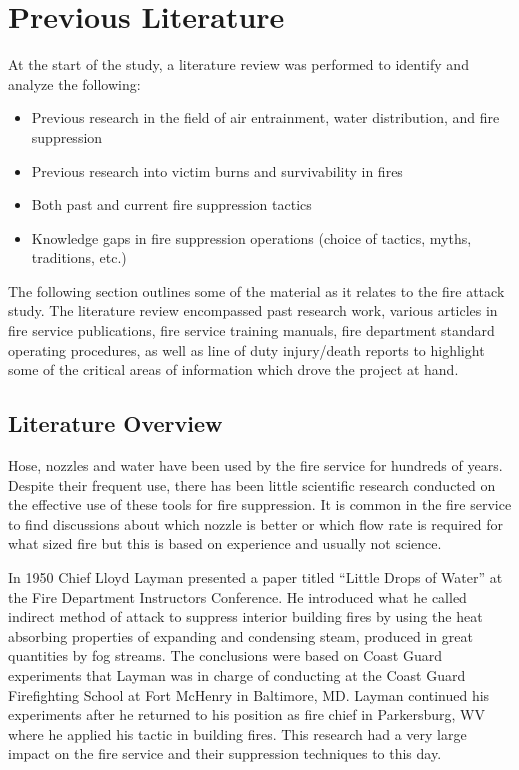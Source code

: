 \documentclass{article}
\begin{document}
\clearpage

\section{Previous Literature}

At the start of the study, a literature review was performed to identify and analyze the following:

\begin{itemize}
	\item Previous research in the field of air entrainment, water distribution, and fire suppression
	\item Previous research into victim burns and survivability in fires
	\item Both past and current fire suppression tactics 
	\item Knowledge gaps in fire suppression operations (choice of tactics, myths, traditions, etc.) 
\end{itemize}

The following section outlines some of the material as it relates to the fire attack study. The literature review encompassed past research work, various articles in fire service publications, fire service training manuals, fire department standard operating procedures, as well as line of duty injury/death reports to highlight some of the critical areas of information which drove the project at hand.

\subsection{Literature Overview}

Hose, nozzles and water have been used by the fire service for hundreds of years. Despite their frequent use, there has been little scientific research conducted on the effective use of these tools for fire suppression. It is common in the fire service to find discussions about which nozzle is better or which flow rate is required for what sized fire but this is based on experience and usually not science. 

In 1950 Chief Lloyd Layman presented a paper titled “Little Drops of Water” at the Fire Department Instructors Conference. He introduced what he called indirect method of attack to suppress interior building fires by using the heat absorbing properties of expanding and condensing steam, produced in great quantities by fog streams. The conclusions were based on Coast Guard experiments that Layman was in charge of conducting at the Coast Guard Firefighting School at Fort McHenry in Baltimore, MD. Layman continued his experiments after he returned to his position as fire chief in Parkersburg, WV where he applied his tactic in building fires.  This research had a very large impact on the fire service and their suppression techniques to this day. 
\end{document}
